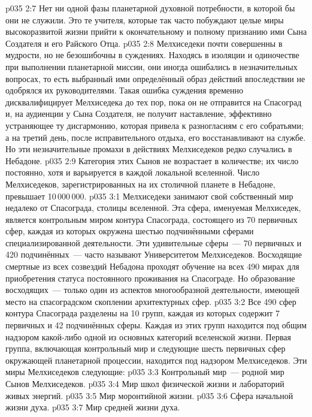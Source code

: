 \vs p035 2:7 Нет ни одной фазы планетарной духовной потребности, в которой бы они не служили. Это те учителя, которые так часто побуждают целые миры высокоразвитой жизни прийти к окончательному и полному признанию ими Сына Создателя и его Райского Отца.
\vs p035 2:8 \pc Мелхиседеки почти совершенны в мудрости, но не безошибочны в суждениях. Находясь в изоляции и одиночестве при выполнении планетарной миссии, они иногда ошибались в незначительных вопросах, то есть выбранный ими определённый образ действий впоследствии не одобрялся их руководителями. Такая ошибка суждения временно дисквалифицирует Мелхиседека до тех пор, пока он не отправится на Спасоград и, на аудиенции у Сына Создателя, не получит наставление, эффективно устраняющее ту дисгармонию, которая привела к разногласиям с его собратьями; а на третий день, после исправительного отдыха, его восстанавливают на службе. Но эти незначительные промахи в действиях Мелхиседеков редко случались в Небадоне.
\vs p035 2:9 Категория этих Сынов не возрастает в количестве; их число постоянно, хотя и варьируется в каждой локальной вселенной. Число Мелхиседеков, зарегистрированных на их столичной планете в Небадоне, превышает 10\,000\,000.
\vs p035 3:1 Мелхиседеки занимают свой собственный мир недалеко от Спасограда, столицы вселенной. Эта сфера, именуемая Мелхиседек, является контрольным миром контура Спасограда, состоящего из 70 первичных сфер, каждая из которых окружена шестью подчинёнными сферами специализированной деятельности. Эти удивительные сферы~--- 70 первичных и 420 подчинённых~--- часто называют Университетом Мелхиседеков. Восходящие смертные из всех созвездий Небадона проходят обучение на всех 490 мирах для приобретения статуса постоянного проживания на Спасограде. Но образование восходящих~--- только один из аспектов многообразной деятельности, имеющей место на спасоградском скоплении архитектурных сфер.
\vs p035 3:2 Все 490 сфер контура Спасограда разделены на 10 групп, каждая из которых содержит 7 первичных и 42 подчинённых сферы. Каждая из этих групп находится под общим надзором какой\hyp{}либо одной из основных категорий вселенской жизни. Первая группа, включающая контрольный мир и следующие шесть первичных сфер окружающей планетарной процессии, находится под надзором Мелхиседеков. Эти миры Мелхиседеков следующие:
\vs p035 3:3 Контрольный мир~--- родной мир Сынов Мелхиседеков.
\vs p035 3:4 Мир школ физической жизни и лабораторий живых энергий.
\vs p035 3:5 Мир моронтийной жизни.
\vs p035 3:6 Сфера начальной жизни духа.
\vs p035 3:7 Мир средней жизни духа.
